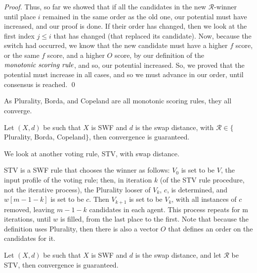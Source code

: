 \documentclass[runningheads,envcountsame]{llncs}
\begin{document}
\begin{proof}
Thus, so far we showed that if all the candidates in the new $\mathcal{R}$-winner until place $i$ remained in the same order as the old one, our potential must have increased, and our proof is done. If their order has changed, then we look at the first index $j \leq i$ that has changed (that replaced its candidate). Now, because the switch had occurred, we know that the new candidate must have a higher $f$ score, or the same $f$ score, and a higher $O$ score, by our definition of the $\emph{monotonic scoring rule}$, and so, our potential increased. So, we proved that the potential must increase in all cases, and so we must advance in our order, until consensus is reached.
\qed\end{proof}

As Plurality, Borda, and Copeland are all monotonic scoring rules, they all converge.

\begin{corollary}
  Let $(X, d)$ be such that $X$ is SWF and $d$ is the swap distance, with $\mathcal{R} \in \{$Plurality, Borda, Copeland$\}$, then convergence is guaranteed.
\end{corollary}

We look at another voting rule, STV, with swap distance.

\begin{definition}
  STV is a SWF rule that chooses the winner as follows:
  $V_0$ is set to be $V$, the input profile of the voting rule;
  then, in iteration $k$ (of the STV rule procedure, not the iterative process), the Plurality looser of $V_k$, $c$, is determined, and $w[m-1-k]$ is set to  be $c$. Then $V_{k+1}$ is set to be $V_k$, with all instances of $c$ removed, leaving $m-1-k$ candidates in each agent.
  This process repeats for m iterations, until $w$ is filled, from the last place to the first.
  Note that because the definition uses Plurality, then there is also a vector $O$ that defines an order on the candidates for it.
\end{definition}

\begin{theorem}\label{theorem:stv}
  Let $(X, d)$ be such that $X$ is SWF and $d$ is the swap distance, and let $\mathcal{R}$ be STV, then convergence is guaranteed.
\end{theorem}
\end{document}
